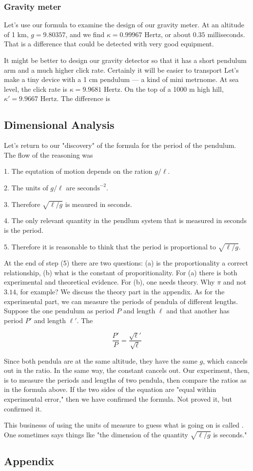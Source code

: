 \subsubsection{Gravity meter}

Let's use our formula to examine the design of our gravity meter.  At an altitude of 1 km, $g = 9.80357$, and we find $\kappa = 0.99967 \text{ Hertz}$, or about $0.35$ milliseconds.  That is a difference that could be detected with very good equipment.  


It might be better to design our gravity detector so that it has a short pendulum arm and a much higher click rate.  Certainly it will be easier to transport  Let's make a tiny device with a 1 cm pendulum — a kind of mini metrnome.  At sea level, the click rate is $\kappa = 9.9681 \text{ Hertz}$. On the top of a 1000 m high hill, $\kappa' = 9.9667 \text{ Hertz}$.  The difference is 

\subsection{Dimensional Analysis}

Let's return to our "discovery" of the formula for the period of the pendulum.  The flow of the reasoning was 

1. The equtation of motion depends on the ration $g/\ell$.

2. The units of $g/\ell$ are $\text{seconds}^{-2}$. 

3.  Therefore $\sqrt{\ell/g}$ is meaured in seconds.

4. The only relevant quantity  in the pendlum system that is measured in seconds is the period.

5. Therefore it is reasonable to think that the period is proportional to $\sqrt{\ell/g}$.

At the end of step (5) there are two questions: (a) is the proportionality a correct relationship, (b) what is the constant of proporitionality.  For (a) there is both experimental and theoretical evidence.  For (b), one needs theory.  Why $\pi$ and not $3.14$, for example?  We discuss the theory part in the appendix. As for the experimental part, we can measure the periods of pendula of different lengths.  Suppose the one pendulum as period $P$ and length $\ell$ and that another has period $P'$ and length $\ell'$.    The 

$$
  \frac{P'}{P} = \frac{\sqrt\ell'}{\sqrt\ell}
$$

Since both pendula are at the same altitude, they have the same $g$, which cancels out in the ratio. In the same way, the constant cancels out. Our experiment, then, is to measure the periods and lengths of two pendula, then compare the ratios as in the formula above.  If the two sides of the equation are "equal within experimental error," then we have confirmed the formula.  Not proved it, but confirmed it. 

This businesss of using the units of measure to guess what is going on is called . One sometimes says things lke "the dimension of the quantity $\sqrt{\ell/g}$ is seconds."


\subsection{Appendix}


